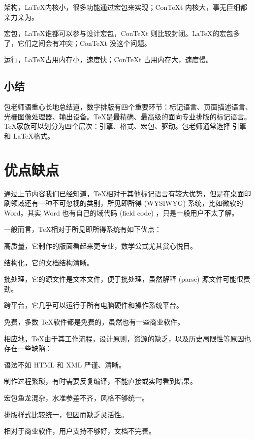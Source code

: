 \begin{compactitem}
    \item 架构，\LaTeX 内核小，很多功能通过宏包来实现；Con\TeX t 内核大，事无巨细都亲力亲为。
    \item 宏包，\LaTeX 谁都可以参与设计宏包，Con\TeX t 则比较封闭。\LaTeX 的宏包多了，它们之间会有冲突；Con\TeX t 没这个问题。
    \item 运行，\LaTeX 占用内存小，速度快；Con\TeX t 占用内存大，速度慢。
\end{compactitem}

\subsection{小结}

包老师语重心长地总结道，数字排版有四个重要环节：标记语言、页面描述语言、光栅图像处理器、输出设备。\TeX 是最精确、最高级的面向专业排版的标记语言。\TeX 家族可以划分为四个层次：引擎、格式、宏包、驱动。包老师通常选择 \XeTeX 引擎和 \LaTeX 格式。

\section{优点缺点}

通过上节内容我们已经知道，\TeX 相对于其他标记语言有较大优势，但是在桌面印刷领域还有一种不可忽视的类别，所见即所得 (WYSIWYG) 系统，比如微软\indexMSFT{}的 Word。其实 Word 也有自己的域代码 (field code) ，只是一般用户不太了解。

一般而言，\TeX 相对于所见即所得系统有如下优点：
\begin{compactitem}
   \item 高质量，它制作的版面看起来更专业，数学公式尤其赏心悦目。
   \item 结构化，它的文档结构清晰。
   \item 批处理，它的源文件是文本文件，便于批处理，虽然解释 (parse) 源文件可能很费劲。
   \item 跨平台，它几乎可以运行于所有电脑硬件和操作系统平台。
   \item 免费，多数 \TeX 软件都是免费的，虽然也有一些商业软件。
\end{compactitem}

相应地，\TeX 由于其工作流程，设计原则，资源的缺乏，以及历史局限性等原因也存在一些缺陷：
\begin{compactitem}
   \item 语法不如 HTML 和 XML 严谨、清晰。
   \item 制作过程繁琐，有时需要反复编译，不能直接或实时看到结果。
   \item 宏包鱼龙混杂，水准参差不齐，风格不够统一。
   \item 排版样式比较统一，但因而缺乏灵活性。
   \item 相对于商业软件，用户支持不够好，文档不完善。
\end{compactitem}

